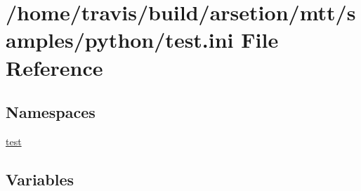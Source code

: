 \hypertarget{test_8ini}{\section{/home/travis/build/arsetion/mtt/samples/python/test.ini File Reference}
\label{test_8ini}
}
\subsection*{Namespaces}
\begin{DoxyCompactItemize}
\item 
\hyperlink{namespacetest}{test}
\end{DoxyCompactItemize}
\subsection*{Variables}
